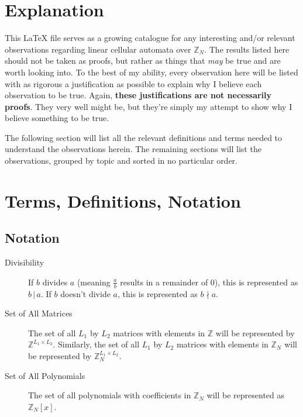 \documentclass[a4paper, reqno, 12pt]{amsart}
\begin{document}
	\tableofcontents
	\section{Explanation}
		This LaTeX file serves as a growing catalogue for any interesting and/or relevant observations regarding linear cellular automata over $\mathds{Z}_N$. The results
		listed here should not be taken as proofs, but rather as things that \emph{may} be true and are worth looking into. To the best of my ability, every observation
		here will be listed with as rigorous a justification as possible to explain why I believe each observation to be true. Again, \textbf{these justifications are not 
		necessarily proofs}. They very well might be, but they're simply my attempt to show why I believe something to be true. 
		
		The following section will list all the relevant definitions and terms needed to understand the observations herein. The remaining sections will list the 
		observations, grouped by topic and sorted in no particular order.
		
	\section{Terms, Definitions, Notation}
		\subsection{Notation}
			\begin{description}
				\item[Divisibility] If $b$ divides $a$ (meaning $\frac{a}{b}$ results in a remainder of 0), this is represented as $b \, | \, a$. If $b$ doesn't divide $a$, 
				this is represented as $b \nmid a$.
				
				\item[Set of All Matrices] The set of all $L_1$ by $L_2$ matrices with elements in $\mathds{Z}$ will be represented by $\mathds{Z}^{L_1 \times L_2}$. 
				Similarly, the set of all $L_1$ by $L_2$ matrices with elements in $\mathds{Z}_{N}$ will be represented by $\mathds{Z}_{N}^{L_1 \times L_2}$.
				
				\item[Set of All Polynomials] The set of all polynomials with coefficients in $\mathds{Z}_{N}$ will be represented as $\mathds{Z}_{N}[x]$.
			\end{description}
			
\end{document}
